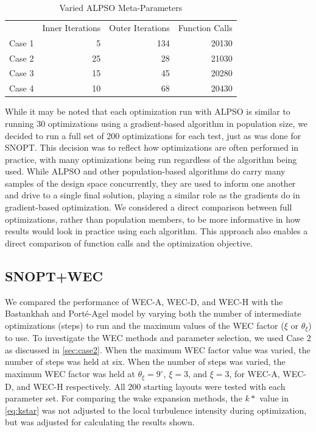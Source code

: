 \documentclass{jpconf}
\begin{document}
\begin{table}[h!]
	\centering
	\caption{Varied ALPSO Meta-Parameters}
	\label{tab:alpsoparams}
	\begin{tabular}{lrrr}
		\toprule
		{} & Inner Iterations & Outer Iterations & Function Calls\\
		\cmidrule(lr){2-4}
		Case 1 &  5  & 134 & 20130 \\
		Case 2 & 25 & 28  & 21030 \\
		Case 3 & 15 & 45 & 20280 \\
		Case 4 & 10 & 68 & 20430 \\
		\bottomrule
	\end{tabular}
\end{table}

While it may be noted that each optimization run with ALPSO is similar to running 30 optimizations using a gradient-based algorithm in population size, we decided to run a full set of 200 optimizations for each test, just as was done for SNOPT. This decision was to reflect how optimizations are often performed in practice, with many optimizations being run regardless of the algorithm being used. While ALPSO and other population-based algorithms do carry many samples of the design space concurrently, they are used to inform one another and drive to a single final solution, playing a similar role as the gradients do in gradient-based optimization. We considered a direct comparison between full optimizations, rather than population members, to be more informative in how results would look in practice using each algorithm. This approach also enables a direct comparison of function calls and the optimization objective.

\subsection{SNOPT+WEC}\label{sec:bpa_wec_comparison}

We compared the performance of WEC-A, WEC-D, and WEC-H with the Bastankhah and Port\'{e}-Agel model by varying both the number of intermediate optimizations (steps) to run and the maximum values of the WEC factor ($\xi$ or $\theta_\xi$) to use. To investigate the WEC methods and parameter selection, we used Case 2 as discussed in \cref{sec:case2}. When the maximum WEC factor value was varied, the number of steps was held at six. When the number of steps was varied, the maximum WEC factor was held at $\theta_\xi = 9 ^\circ$, $\xi=3$, and $\xi=3$, for WEC-A, WEC-D, and WEC-H respectively. All 200 starting layouts were tested with each parameter set. For comparing the wake expansion methods, the $k*$ value in \cref{eq:kstar} was not adjusted to the local turbulence intensity during optimization, but was adjusted for calculating the results shown.
\end{document}
